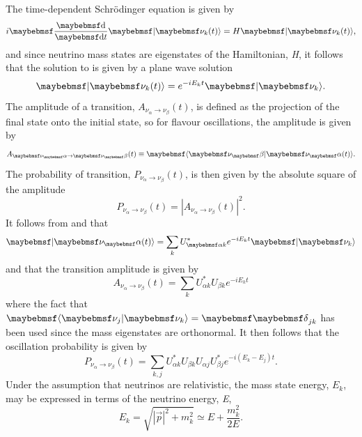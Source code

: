 The time-dependent Schr{\"o}dinger equation is given by
\begin{equation} \label{eqn:t.d. schrodinger}
    i \dByd{}{t}\ket{\nu_{k}(t)} = H \ket{\nu_{k}(t)},
\end{equation}
and since neutrino mass states are eigenstates of the Hamiltonian, \textit{H},  it follows that the solution to  is given by a plane wave solution 
\begin{equation}\label{eqn:plane wave soln}
    \ket{\nu_{k}(t)} = e^{-iE_{k}t} \ket{\nu_{k}}.
\end{equation}
The amplitude of a transition, $A_{\nu_\alpha \rightarrow \nu_\beta}(t)$, is defined as the projection of the final state onto the initial state, so for flavour oscillations, the amplitude is given by
\begin{equation}
    A_{\nu_\alpha \rightarrow \nu_\beta}(t) \isdefinedas \braket{\nu_\beta|\nu_\alpha(t)}.
\end{equation}
The probability of transition, $P_{\nu_\alpha \rightarrow \nu_\beta}(t)$, is then given by the absolute square of the amplitude
\begin{equation}
    P_{\nu_\alpha \rightarrow \nu_\beta}(t) = |A_{\nu_\alpha \rightarrow \nu_\beta}(t)|^2.
\end{equation}
It follows from  and  that
\begin{equation}
    \ket{\nu_\alpha(t)} = \sum_k U^*_{\alpha k} e^{-iE_kt}\ket{\nu_k}
\end{equation}
and that the transition amplitude is given by
\begin{equation}
    A_{\nu_\alpha \rightarrow \nu_\beta}(t) = \sum_k U^*_{\alpha k} U_{\beta k} e^{-iE_kt}
\end{equation}
where the fact that $\braket{\nu_j|\nu_k} = \Kronecker_{jk}$ has been used since the mass eigenstates are orthonormal. It then follows that the oscillation probability is given by
\begin{equation}
    P_{\nu_\alpha \rightarrow \nu_\beta}(t) = \sum_{k,j} U^*_{\alpha k} U_{\beta k} U_{\alpha j} U^*_{\beta j} e^{-i(E_k-E_j)t}.
\end{equation}
Under the assumption that neutrinos are relativistic, the mass state energy, $E_k$, may be expressed in terms of the neutrino energy, \textit{E},
\begin{equation}
    E_k = \sqrt{|\Vec{p}|^2 + m_k^2} \simeq E + \frac{m_k^2}{2E}.
\end{equation}
